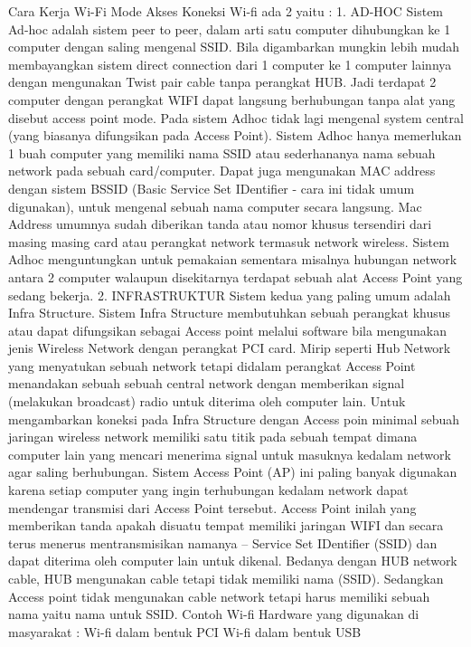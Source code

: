  Cara Kerja Wi-Fi
 Mode Akses Koneksi Wi-fi ada 2 yaitu :
1. AD-HOC
Sistem Ad-hoc adalah sistem peer to peer, dalam arti satu computer dihubungkan ke 1 computer dengan saling mengenal SSID. Bila digambarkan mungkin lebih mudah membayangkan sistem direct connection dari 1 computer ke 1 computer lainnya dengan mengunakan Twist pair cable tanpa perangkat HUB. Jadi terdapat 2 computer dengan perangkat WIFI dapat langsung berhubungan tanpa alat yang disebut access point mode. Pada sistem Adhoc tidak lagi mengenal system central (yang biasanya difungsikan pada Access Point). Sistem Adhoc hanya memerlukan 1 buah computer yang memiliki nama SSID atau sederhananya nama sebuah network pada sebuah card/computer. Dapat juga mengunakan MAC address dengan sistem BSSID (Basic Service Set IDentifier - cara ini tidak umum digunakan), untuk mengenal sebuah nama computer secara langsung. Mac Address umumnya sudah diberikan tanda atau nomor khusus tersendiri dari masing masing card atau 
perangkat network termasuk network wireless. Sistem Adhoc menguntungkan untuk pemakaian sementara misalnya hubungan network antara 2 computer walaupun disekitarnya terdapat sebuah alat Access Point yang sedang bekerja.
2. INFRASTRUKTUR
Sistem kedua yang paling umum adalah Infra Structure. Sistem Infra Structure membutuhkan sebuah perangkat khusus atau dapat difungsikan sebagai Access point melalui software bila mengunakan jenis Wireless Network dengan perangkat PCI card. Mirip seperti Hub Network yang menyatukan sebuah network tetapi didalam perangkat Access Point menandakan sebuah sebuah central network dengan memberikan signal (melakukan broadcast) radio untuk diterima oleh computer lain. Untuk mengambarkan koneksi pada Infra Structure dengan Access poin minimal sebuah jaringan wireless network memiliki satu titik pada sebuah tempat dimana computer lain yang mencari menerima signal untuk masuknya kedalam network agar saling berhubungan. Sistem Access Point (AP) ini  paling banyak digunakan karena setiap computer yang ingin terhubungan kedalam network dapat mendengar transmisi dari Access Point tersebut. Access Point inilah yang memberikan
 tanda apakah disuatu tempat memiliki jaringan WIFI dan secara terus menerus mentransmisikan namanya – Service Set IDentifier (SSID) dan dapat diterima oleh computer lain untuk dikenal. Bedanya dengan HUB network cable, HUB mengunakan cable tetapi tidak memiliki nama (SSID). Sedangkan Access point tidak mengunakan cable network tetapi harus memiliki sebuah nama yaitu nama untuk SSID. Contoh Wi-fi Hardware yang digunakan di masyarakat : Wi-fi dalam bentuk PCI Wi-fi dalam bentuk USB



